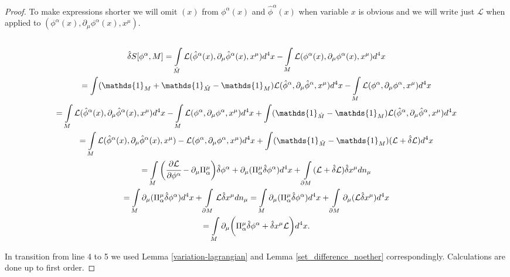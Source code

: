 \documentclass[main.tex]{subfiles}
\begin{document}
\begin{proof}
To make expressions shorter we will omit $(x)$ from $\phi^\alpha(x)$ and $\hat{\phi}^\alpha(x)$ when variable $x$ is obvious and we will write just $\mathcal{L}$ when applied to $(\phi^\alpha(x), \partial_\mu \phi^\alpha(x), x^\mu)$.
\begin{multline*}
\\
\hat{\delta}S[\phi^\alpha, M] = \int\limits_{\hat{M}} 
\mathcal{L}(\hat{\phi}^\alpha(x), \partial_\mu \hat{\phi}^\alpha(x), x^\mu) d^4 x -
\int\limits_M \mathcal{L}(\phi^\alpha(x), \partial_\mu \phi^\alpha(x), x^\mu) d^4 x
\\ = \int (\mathds{1}_{M} + \mathds{1}_{\hat{M}} - \mathds{1}_{M})
\mathcal{L}(\hat{\phi}^\alpha, \partial_\mu \hat{\phi}^\alpha, x^\mu) d^4 x
- \int\limits_M \mathcal{L}(\phi^\alpha, \partial_\mu \phi^\alpha, x^\mu) d^4 x
\\ = \int\limits_{M} 
\mathcal{L}(\hat{\phi}^\alpha(x), \partial_\mu \hat{\phi}^\alpha(x), x^\mu) d^4 x - \int\limits_M \mathcal{L}(\phi^\alpha, \partial_\mu \phi^\alpha, x^\mu) d^4 x
+ \int (\mathds{1}_{\hat{M}} - \mathds{1}_{M})
\mathcal{L}(\hat{\phi}^\alpha, \partial_\mu \hat{\phi}^\alpha, x^\mu) d^4 x
\\ =  \int\limits_{M} 
\mathcal{L}(\hat{\phi}^\alpha(x), \partial_\mu \hat{\phi}^\alpha(x), x^\mu) - \mathcal{L}(\phi^\alpha, \partial_\mu \phi^\alpha, x^\mu) d^4 x + 
\int (\mathds{1}_{\hat{M}} - \mathds{1}_{M})
(\mathcal{L} + \hat{\delta}\mathcal{L}) d^4 x
\\ = \int\limits_M \bigg(\cfrac{\partial \mathcal{L}}{\partial \phi^\alpha} - \partial_\mu \Pi^\mu_\alpha \bigg){\hat{\delta}}\phi^\alpha + \partial_\mu(\Pi^\mu_\alpha {\hat{\delta}}\phi^\alpha)d^4 x
+ \int\limits_{\partial M} (\mathcal{L} + \hat{\delta}\mathcal{L}) \hat{\delta} x^\mu dn_\mu
\\ = \int\limits_M \partial_\mu(\Pi^\mu_\alpha {\hat{\delta}}\phi^\alpha)d^4 x + \int\limits_{\partial M} \mathcal{L} \hat{\delta} x^\mu dn_\mu = \int\limits_M \partial_\mu(\Pi^\mu_\alpha {\hat{\delta}}\phi^\alpha)d^4 x + \int\limits_{\partial M} \partial_\mu (\mathcal{L} \hat{\delta} x^\mu) d^4 x
\\ =  \int\limits_M \partial_\mu \bigg( \Pi_\alpha^\mu \hat{\delta} \phi^\alpha + \hat{\delta}x^\mu \mathcal{L} \bigg)d^4 x.
\\
\end{multline*}

In transition from line 4 to 5 we used Lemma \ref{variation-lagrangian} and Lemma \ref{set_difference_noether} correspondingly. Calculations are done up to first order.

\end{proof}
\end{document}
